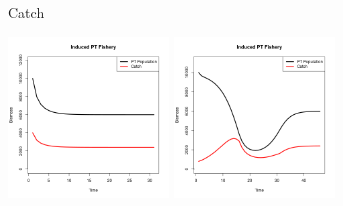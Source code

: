 \documentclass[ xcolor = pdftex, dvipsnames, table ]{beamer}
\begin{document}
\begin{frame}{Catch}
{\begin{center}
\vspace*{-0.1cm}
\includegraphics[width=0.32\textwidth]{../../.././nick/gpBias/bioCatchFlatNoQX2Z0.6.png}
\hspace*{1cm}
\includegraphics[width=0.32\textwidth]{../../.././nick/gpBias/bioCatchExpT45X2Z0.6.png}
\end{center}
}
\end{frame}
\end{document}
